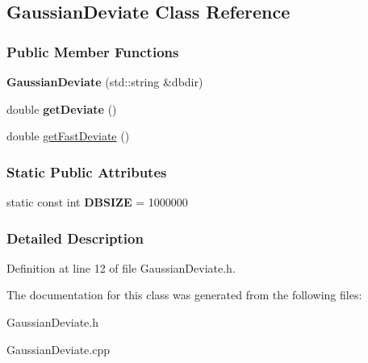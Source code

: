\hypertarget{classGaussianDeviate}{
\subsection{GaussianDeviate Class Reference}
\label{classGaussianDeviate}
}
\subsubsection*{Public Member Functions}
\begin{DoxyCompactItemize}
\item 
\hypertarget{classGaussianDeviate_a654ded9268df74c252c32ea00c8abafa}{
{\bfseries GaussianDeviate} (std::string \&dbdir)}
\label{classGaussianDeviate_a654ded9268df74c252c32ea00c8abafa}

\item 
\hypertarget{classGaussianDeviate_ad98fee7b19ed54a1bb6db1fb8150157e}{
double {\bfseries getDeviate} ()}
\label{classGaussianDeviate_ad98fee7b19ed54a1bb6db1fb8150157e}

\item 
\hypertarget{classGaussianDeviate_a356bb7235f0d7da3330772bc05b389f0}{
double \hyperlink{classGaussianDeviate_a356bb7235f0d7da3330772bc05b389f0}{getFastDeviate} ()}
\label{classGaussianDeviate_a356bb7235f0d7da3330772bc05b389f0}

\end{DoxyCompactItemize}
\subsubsection*{Static Public Attributes}
\begin{DoxyCompactItemize}
\item 
\hypertarget{classGaussianDeviate_a14d3c4e3117ce6c6d37a4cbc264c321a}{
static const int {\bfseries DBSIZE} = 1000000}
\label{classGaussianDeviate_a14d3c4e3117ce6c6d37a4cbc264c321a}

\end{DoxyCompactItemize}


\subsubsection{Detailed Description}


Definition at line 12 of file GaussianDeviate.h.



The documentation for this class was generated from the following files:\begin{DoxyCompactItemize}
\item 
GaussianDeviate.h\item 
GaussianDeviate.cpp\end{DoxyCompactItemize}
